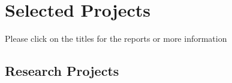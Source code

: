 \documentclass[10pt]{article} %
\begin{document}
%
%
%
%
%


\section{Selected Projects}
\vspace{-4mm}
{\footnotesize Please click on the titles for the reports or more information}

\subsection{Research Projects}
\end{document}
